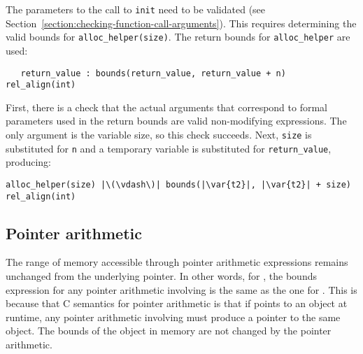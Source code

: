 %
%
%
%

The parameters to the call to \lstinline|init| need to be validated
(see Section~\ref{section:checking-function-call-arguments}). This
requires determining the valid bounds for \lstinline|alloc_helper(size)|. The
return bounds for \lstinline|alloc_helper| are used:
\begin{lstlisting}
   return_value : bounds(return_value, return_value + n) rel_align(int)
\end{lstlisting}

First, there is a check that the actual arguments that correspond to
formal parameters used in the return bounds are valid non-modifying
expressions. The only argument is the variable size, so this check
succeeds. Next, \lstinline|size| is substituted for \lstinline|n| and
a temporary variable is substituted for \lstinline|return_value|, producing:
\begin{lstlisting}[escapechar=\|]
   alloc_helper(size) |\(\vdash\)| bounds(|\var{t2}|, |\var{t2}| + size) rel_align(int)
\end{lstlisting}

\subsection{Pointer arithmetic}

The range of memory accessible through pointer arithmetic expressions
remains unchanged from the underlying pointer. In other words, for
, the bounds expression for any
pointer arithmetic involving  is the same as the one for
. This is because that C semantics for pointer arithmetic is
that if  points to an object at runtime, any pointer arithmetic
involving  must produce a pointer to the same object. The bounds
of the object in memory are not changed by the pointer arithmetic.

